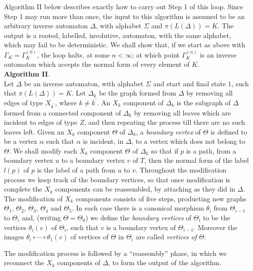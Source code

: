 \documentclass[a4paper,12pt]{article}
\renewcommand{\a}{\alpha }
\newcommand{\G}{\Gamma }
\newcommand{\D}{\Delta }
\newcommand{\T}{\Theta }
\renewcommand{\S}{\Sigma }
\numberwithin{equation}{section}
\numberwithin{figure}{section}
\begin{document}
Algorithm II below describes exactly how to carry out Step 1 of this loop.
Since Step 1 may run more than once,  the input to this algorithm is
assumed to be an
arbitrary inverse automaton $\D$, with alphabet $\S$ and  
$\pi(L(\D))=K$. The output  is a rooted, labelled, involutive, automaton,
with the same alphabet, 
which may fail to be deterministic. 
We shall show that, if we start as above
with $\G_K=\G_K^{(0)}$,  the loop halts, at some $n<\infty$;  
at which point $\G_K^{(n)}$ is an inverse automaton which accepts the
normal form of every element of $K$. \\[1em]

\noindent\textbf{Algorithm II}. \\

Let $\D$ be an inverse automaton, with alphabet $\S$ and 
start and final state $1$, such that
$\pi(L(\D))=K$.  
Let $\D_k$ be the graph formed from $\D$ by removing all edges of
type $X_{k^\prime}$, where $k\neq k^\prime$. An $X_k$ component of
$\D_k$ is the subgraph of $\D$ formed from a connected component
of $\D_k$ by removing all leaves which are incident to edges of
type $Z$, and then repeating the process till there are no such
leaves left. Given an $X_k$ component $\T$ of $\D_k$,  a
{\em boundary vertex} of $\T$ is defined to be a vertex
$\a$ such that $\a$ is incident, in $\D$, to a vertex which does not
belong to $\T$.  
 We shall modify each  $X_k$ component $\T$ of $\D_k$ so that if $p$ is a path,
from a  boundary vertex $u$  to a boundary vertex $v$ of $T$,   
then the normal form  of  the
label $l(p)$ of $p$ is the label of a path from $u$ to $v$. Throughout
the modification process we keep track of the boundary vertices, so that 
once modification is complete the $X_k$ components can be reassembled, by
attaching as they did in $\D$. The modification of $X_k$ components 
consists of five steps, producting new graphs $\T_1$, $\T_2$, $\T_3$, $\T_4$ and $\T_5$. 
In each case there is a canonical morphism $\theta_i$ from $\T_{i-1}$ to $\T_i$ and,
 (writing $\T=\T_0$)  
we define the {\em boundary vertices} of $\T_{i}$ to be the vertices $\theta_{i}(v)$
of $\T_i$, such that $v$ is a boundary vertex of $\T_{i-1}$. Moreover the
 images $\theta_i\circ \cdots\circ \theta_1(v)$ of vertices of $\T$ in $\T_i$ are 
called {\em vertices of} $\T$. 

The modification process is followed by a ``reassembly'' phase, in which
we reconnect the $X_k$ components of $\D$, to form the output of the algorithm.
\\[1em]
\end{document}
